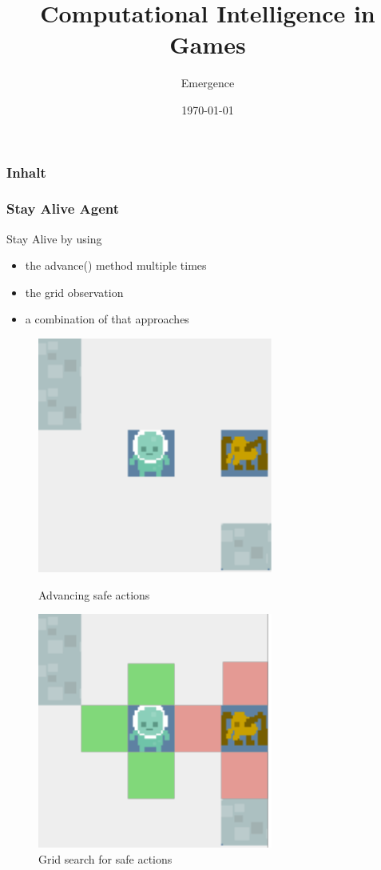 \documentclass{beamer}
\title{Computational Intelligence in Games}
\author{Emergence}
\date{\today}
\institute{Otto-von-Guericke-University Magdeburg}
\begin{document}
\begin{frame}[plain]
 \titlepage
\end{frame}


\section[Agenda]{}
\begin{frame}
\frametitle{Inhalt}
\tableofcontents
\end{frame}


\begin{frame}
\frametitle{Stay Alive Agent}
Stay Alive by using
\begin{itemize}
\item the advance() method multiple times
\item the grid observation
\item a combination of that approaches
\end{itemize}

\begin{figure}
\centering
\begin{minipage}{.5\textwidth}
  \centering
\includegraphics[scale=0.8]{../report/images/safe.pdf}
\caption{Advancing safe actions}
\label{fig:safe}
\end{minipage}%
\begin{minipage}{.5\textwidth}
\centering
\includegraphics[scale=0.8]{../report/images/safe_grid.pdf}
\caption{Grid search for safe actions}
\label{fig:safe_grid}
\end{minipage}
\end{figure}



\end{frame}
\end{document}
